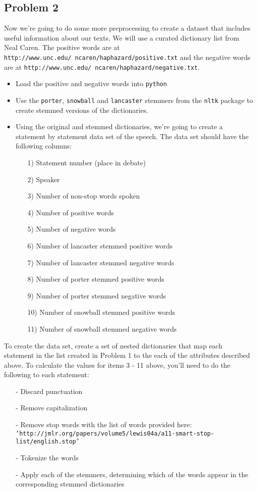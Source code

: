 \documentclass[12pt,letterpaper]{article}
\begin{document}
\subsection*{Problem 2}
Now we're going to do some more preprocessing to create a dataset that includes useful information about our texts. We will use a curated dictionary list from Neal Caren. The positive words are at {\tt http://www.unc.edu/~ncaren/haphazard/positive.txt} and the negative words are at {\tt http://www.unc.edu/~ncaren/haphazard/negative.txt}.
\begin{itemize}
\item Load the positive and negative words into {\tt python} 

\item Use the {\tt porter}, {\tt snowball} and {\tt lancaster} stemmers from the {\tt nltk} package to create stemmed versions of the dictionaries.


\item Using the original and stemmed dictionaries, we're going to create a statement by statement data set of the speech. 
The data set should have the following columns: 
\begin{itemize}
\item[1)] Statement number (place in debate)
\item[2)] Speaker 
\item[3)] Number of non-stop words spoken
\item[4)] Number of positive words
\item[5)] Number of negative words
\item[6)] Number of lancaster stemmed positive words
\item[7)] Number of lancaster stemmed negative words
\item[8)] Number of porter stemmed positive words
\item[9)] Number of porter stemmed negative words
\item[10)] Number of snowball stemmed positive words
\item[11)] Number of snowball stemmed negative words
\end{itemize}
\end{itemize}

To create the data set, create a set of nested dictionaries that map each statement in the list created in Problem 1 to the each of the attributes described above. To  calculate the values for items 3 - 11 above, you'll need to do the following to each statement:
\begin{itemize}
\item[-] Discard punctuation
\item[-] Remove capitalization
\item[-] Remove stop words with the list of words provided here: \\
{\tt `http://jmlr.org/papers/volume5/lewis04a/a11-smart-stop-list/english.stop'}
\item[-] Tokenize the words
\item[-] Apply each of the stemmers, determining which of the words appear in the corresponding stemmed dictionaries
\end{itemize}
\end{document}
